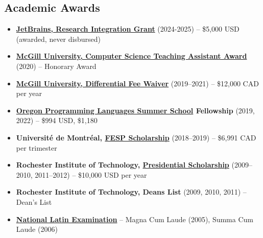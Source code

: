 \documentclass[letterpaper,11pt]{article}
\newcommand{\resumeItem}[2]{
  \item\small{\textbf{#1}{ #2 }}
}
\newcommand{\resumeSubItem}[2]{\resumeItem{#1}{#2}}
\newcommand{\resumeSubHeadingListStart}{\begin{itemize}[leftmargin=*]}
\newcommand{\resumeSubHeadingListEnd}{\end{itemize}}
\begin{document}
\begin{justify}
\section{Academic Awards}
\resumeSubHeadingListStart
\resumeSubItem{\href{https://lp.jetbrains.com/ide-research-grant/}{JetBrains, Research Integration Grant}}{(2024-2025) -- \$5,000 USD (awarded, never disbursed)}
\resumeSubItem{\href{https://www.cs.mcgill.ca/academic/ta/awards/winners/}{McGill University, Computer Science Teaching Assistant Award}}{(2020) -- Honorary Award}
\resumeSubItem{\href{https://www.mcgill.ca/expmed/funding-and-awards/differential-fee-waivers}{McGill University, Differential Fee Waiver}}{(2019--2021) -- \$12,000 CAD per year}
\resumeSubItem{\href{https://www.cs.uoregon.edu/research/summerschool/summer19/}{Oregon Programming Languages Summer School} Fellowship}{(2019, 2022) -- \$994 USD, \$1,180}
\resumeSubItem{Universit\'e de Montr\'eal, \href{https://esp.umontreal.ca/english/what-you-need-to-know/international/scholarship/}{FESP Scholarship}}{(2018--2019) -- \$6,991 CAD per trimester}
\resumeSubItem{Rochester Institute of Technology, \href{https://www.rit.edu/admissions/aid/merit-based-scholarships}{Presidential Scholarship}}{(2009--2010, 2011--2012) -- \$10,000 USD per year}
\resumeSubItem{Rochester Institute of Technology, Deans List}{(2009, 2010, 2011) -- Dean's List}
\resumeSubItem{\href{https://www.nle.org/}{National Latin Examination}}{-- Magna Cum Laude (2005), Summa Cum Laude (2006)}
\resumeSubHeadingListEnd


\end{justify}
\end{document}
